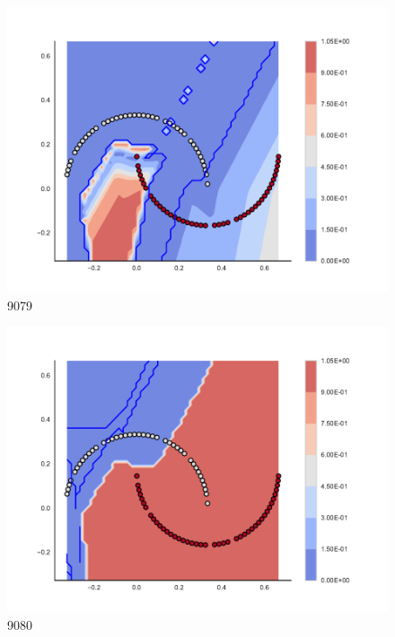 \begin{subfigure}[b]{0.09\textwidth}
    \includegraphics[clip, trim=2.35cm 1.75cm 4.5cm 0cm,width=\textwidth]{img/convergence/9079.pdf}
    \caption{9079}
    \label{fig:convergence_9079}
\end{subfigure}
%
\begin{subfigure}[b]{0.09\textwidth}
    \includegraphics[clip, trim=2.35cm 1.75cm 4.5cm 0cm,width=\textwidth]{img/convergence/9080.pdf}
    \caption{9080}
    \label{fig:convergence_9080}
\end{subfigure}
%

